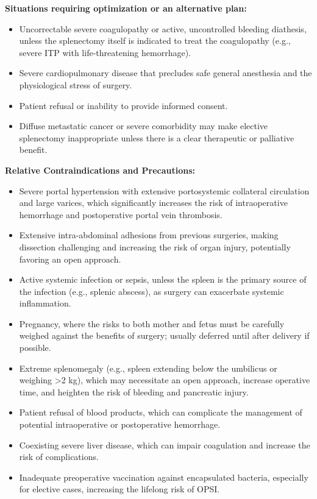 \textbf{Situations requiring optimization or an alternative plan:}
\begin{itemize}
  \item Uncorrectable severe coagulopathy or active, uncontrolled bleeding diathesis, unless the splenectomy itself is indicated to treat the coagulopathy (e.g., severe ITP with life-threatening hemorrhage).
  \item Severe cardiopulmonary disease that precludes safe general anesthesia and the physiological stress of surgery.
  \item Patient refusal or inability to provide informed consent.
  \item Diffuse metastatic cancer or severe comorbidity may make elective splenectomy inappropriate unless there is a clear therapeutic or palliative benefit.
\end{itemize}

\textbf{Relative Contraindications and Precautions:}
\begin{itemize}
  \item Severe portal hypertension with extensive portosystemic collateral circulation and large varices, which significantly increases the risk of intraoperative hemorrhage and postoperative portal vein thrombosis.
  \item Extensive intra-abdominal adhesions from previous surgeries, making dissection challenging and increasing the risk of organ injury, potentially favoring an open approach.
  \item Active systemic infection or sepsis, unless the spleen is the primary source of the infection (e.g., splenic abscess), as surgery can exacerbate systemic inflammation.
  \item Pregnancy, where the risks to both mother and fetus must be carefully weighed against the benefits of surgery; usually deferred until after delivery if possible.
  \item Extreme splenomegaly (e.g., spleen extending below the umbilicus or weighing >2 kg), which may necessitate an open approach, increase operative time, and heighten the risk of bleeding and pancreatic injury.
  \item Patient refusal of blood products, which can complicate the management of potential intraoperative or postoperative hemorrhage.
  \item Coexisting severe liver disease, which can impair coagulation and increase the risk of complications.
  \item Inadequate preoperative vaccination against encapsulated bacteria, especially for elective cases, increasing the lifelong risk of OPSI.
\end{itemize}

